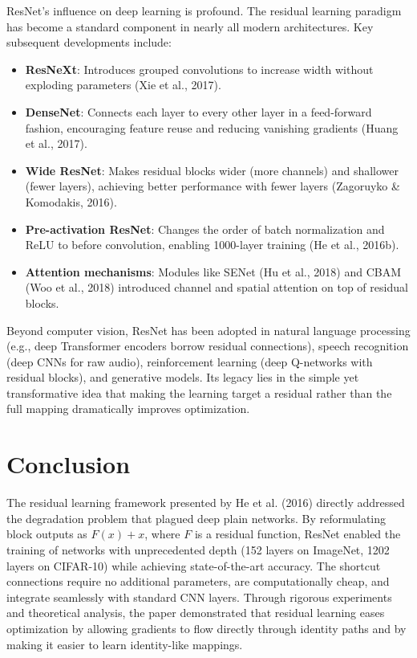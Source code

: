 \documentclass[11pt,a4paper]{article}
\begin{document}
ResNet's influence on deep learning is profound. The residual learning paradigm has become a standard component in nearly all modern architectures. Key subsequent developments include:
\begin{itemize}
    \item \textbf{ResNeXt}: Introduces grouped convolutions to increase width without exploding parameters (Xie et al., 2017).
    \item \textbf{DenseNet}: Connects each layer to every other layer in a feed-forward fashion, encouraging feature reuse and reducing vanishing gradients (Huang et al., 2017).
    \item \textbf{Wide ResNet}: Makes residual blocks wider (more channels) and shallower (fewer layers), achieving better performance with fewer layers (Zagoruyko \& Komodakis, 2016).
    \item \textbf{Pre-activation ResNet}: Changes the order of batch normalization and ReLU to before convolution, enabling 1000-layer training (He et al., 2016b).
    \item \textbf{Attention mechanisms}: Modules like SENet (Hu et al., 2018) and CBAM (Woo et al., 2018) introduced channel and spatial attention on top of residual blocks.
\end{itemize}

Beyond computer vision, ResNet has been adopted in natural language processing (e.g., deep Transformer encoders borrow residual connections), speech recognition (deep CNNs for raw audio), reinforcement learning (deep Q-networks with residual blocks), and generative models. Its legacy lies in the simple yet transformative idea that making the learning target a residual rather than the full mapping dramatically improves optimization.

\section{Conclusion}
\label{sec:conclusion}

The residual learning framework presented by He et al. (2016) directly addressed the degradation problem that plagued deep plain networks. By reformulating block outputs as $F(x) + x$, where $F$ is a residual function, ResNet enabled the training of networks with unprecedented depth (152 layers on ImageNet, 1202 layers on CIFAR-10) while achieving state-of-the-art accuracy. The shortcut connections require no additional parameters, are computationally cheap, and integrate seamlessly with standard CNN layers. Through rigorous experiments and theoretical analysis, the paper demonstrated that residual learning eases optimization by allowing gradients to flow directly through identity paths and by making it easier to learn identity-like mappings.
\end{document}
